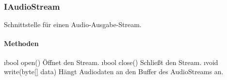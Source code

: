 \documentclass[../entwurf.tex]{subfiles}
\begin{document}
\subsubsection{IAudioStream}
Schnittstelle für einen Audio-Ausgabe-Stream.
\paragraph{Methoden}
\begin{itemize}
	\i{bool open()} Öffnet den Stream.
	\i{bool close()} Schließt den Stream.
	\i{void write(byte[] data)} Hängt Audiodaten an den Buffer des AudioStreams an.
\end{itemize}

\end{document}
